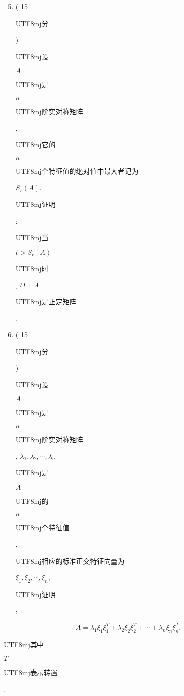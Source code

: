 \documentclass[10pt]{article}
\begin{document}
\begin{enumerate}
  \setcounter{enumi}{4}
  \item ( 15 \begin{CJK}{UTF8}{mj}分\end{CJK}) \begin{CJK}{UTF8}{mj}设\end{CJK} $A$ \begin{CJK}{UTF8}{mj}是\end{CJK} $n$ \begin{CJK}{UTF8}{mj}阶实对称矩阵\end{CJK}, \begin{CJK}{UTF8}{mj}它的\end{CJK} $n$ \begin{CJK}{UTF8}{mj}个特征值的绝对值中最大者记为\end{CJK} $S_{r}(A)$. \begin{CJK}{UTF8}{mj}证明\end{CJK}: \begin{CJK}{UTF8}{mj}当\end{CJK} $t>S_{r}(A)$ \begin{CJK}{UTF8}{mj}时\end{CJK}, $t I+A$ \begin{CJK}{UTF8}{mj}是正定矩阵\end{CJK}.

  \item ( 15 \begin{CJK}{UTF8}{mj}分\end{CJK}) \begin{CJK}{UTF8}{mj}设\end{CJK} $A$ \begin{CJK}{UTF8}{mj}是\end{CJK} $n$ \begin{CJK}{UTF8}{mj}阶实对称矩阵\end{CJK}, $\lambda_{1}, \lambda_{2}, \cdots, \lambda_{n}$ \begin{CJK}{UTF8}{mj}是\end{CJK} $A$ \begin{CJK}{UTF8}{mj}的\end{CJK} $n$ \begin{CJK}{UTF8}{mj}个特征值\end{CJK}, \begin{CJK}{UTF8}{mj}相应的标准正交特征向量为\end{CJK} $\xi_{1}, \xi_{2}, \cdots, \xi_{n}$, \begin{CJK}{UTF8}{mj}证明\end{CJK}:

\end{enumerate}
$$
A=\lambda_{1} \xi_{1} \xi_{1}^{T}+\lambda_{2} \xi_{2} \xi_{2}^{T}+\cdots+\lambda_{n} \xi_{n} \xi_{n}^{T} .
$$
\begin{CJK}{UTF8}{mj}其中\end{CJK} $T$ \begin{CJK}{UTF8}{mj}表示转置\end{CJK}.
\end{document}
